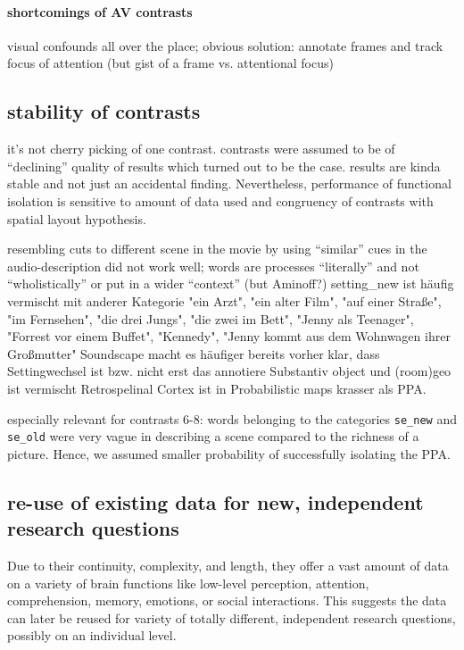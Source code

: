 \documentclass[english]{article}
\begin{document}
\paragraph{shortcomings of AV contrasts}
visual confounds all over the place; obvious solution: annotate frames and track
focus of attention (but gist of a frame vs. attentional focus)



\subsection{stability of contrasts}
it's not cherry picking of one contrast.
contrasts were assumed to be of ``declining'' quality of results which turned
out to be the case.
results are kinda stable and not just an accidental finding. Nevertheless,
performance of functional isolation is sensitive to amount of data used and
congruency of contrasts with spatial layout hypothesis.

resembling cuts to different scene in the movie by using ``similar'' cues in the
audio-description did not work well; words are processes ``literally'' and not
``wholistically'' or put in a wider ``context'' (but Aminoff?)
%
setting\_new ist häufig vermischt mit anderer Kategorie "ein Arzt", "ein alter
Film", "auf einer Straße", "im Fernsehen", "die drei Jungs", "die zwei im Bett",
"Jenny als Teenager", "Forrest vor einem Buffet", "Kennedy", "Jenny kommt aus
dem Wohnwagen ihrer Großmutter"
Soundscape macht es häufiger bereits vorher klar, dass Settingwechsel ist bzw.
nicht erst das annotiere Substantiv object und (room)geo ist vermischt
Retrospelinal Cortex ist in Probabilistic maps krasser als PPA.

especially relevant for contrasts 6-8: words belonging to the categories
\texttt{se\_new} and \texttt{se\_old} were very vague in describing a scene
compared to the richness of a picture. Hence, we assumed smaller probability of
successfully isolating the PPA.

\subsection{re-use of existing data for new, independent research questions}
Due to their continuity,
complexity, and length, they offer a vast amount of data on a variety of brain
functions like low-level perception, attention, comprehension, memory, emotions,
or social interactions. This suggests the data can later be reused for variety
of totally different, independent research questions, possibly on an individual
level.
\end{document}
